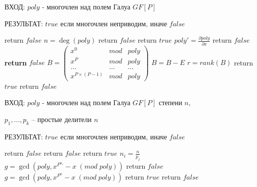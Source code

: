 \documentclass[fleqn,14pt,a5paper]{article}
\begin{document}
\par ВХОД: $poly$ - многочлен над полем Галуа $GF[P]$
\par РЕЗУЛЬТАТ: $true$ если многочлен неприводим, иначе $false$

\begin{algorithmic}[1]

        \State return $false$
    \EndIf
    \State $n = \deg(poly)$
        \State return $false$
    \EndIf
        \State return $true$
    \EndIf
    \State
    \State $poly' = \frac{\partial poly}{\partial x}$
        \State return $false$
    \EndIf
        \State \textbf{return} $false$
    \EndIf
    \State $B =
        \begin{pmatrix}
        x^0 & mod & poly \\
        x^P & mod & poly \\
        \dots & \dots & \dots \\
        x^{P\times (P-1)} & mod & poly
        \end{pmatrix}$
    \State $B = B - E$
    \State $r = rank(B)$
        \State return $true$
    \Else
        \State return $false$
    \EndIf

\end{algorithmic}

\clearpage

\par ВХОД: $poly$ - многочлен над полем Галуа $GF[P]$ степени $n$,
    \par $p_1, \dots, p_k$ – простые делители $n$
\par РЕЗУЛЬТАТ: $true$ если многочлен неприводим, иначе $false$

\begin{algorithmic}[1]

        \State return $false$
    \EndIf
        \State return $false$
    \EndIf
        \State return $true$
    \EndIf
    \State
        \State $n_i = \frac{n}{p_j}$
        \State $g = \gcd\left( poly, x^{P^{n_i}} - x \; (mod \; poly) \right)$
            \State return $false$
        \EndIf
    \EndFor
    \State $g = \gcd\left( poly, x^{P^n} - x \; (mod \; poly) \right)$
        \State return $true$
    \Else
        \State return $false$
    \EndIf

\end{algorithmic}
\end{document}
